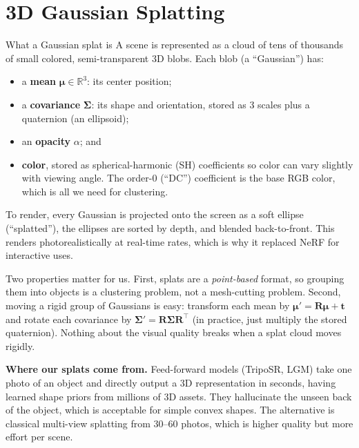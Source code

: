 \documentclass[11pt]{article}
\newcommand{\R}{\mathbf{R}}
\newcommand{\tr}{\mathbf{t}}
\begin{document}
\section{3D Gaussian Splatting}

\begin{concept}{What a Gaussian splat is}
A scene is represented as a cloud of tens of thousands of small colored, semi-transparent 3D blobs. Each blob (a ``Gaussian'') has:
\begin{itemize}[itemsep=2pt]
  \item a \textbf{mean} $\boldsymbol{\mu} \in \mathbb{R}^3$: its center position;
  \item a \textbf{covariance} $\boldsymbol{\Sigma}$: its shape and orientation, stored as 3 scales plus a quaternion (an ellipsoid);
  \item an \textbf{opacity} $\alpha$; and
  \item \textbf{color}, stored as spherical-harmonic (SH) coefficients so color can vary slightly with viewing angle. The order-0 (``DC'') coefficient is the base RGB color, which is all we need for clustering.
\end{itemize}
To render, every Gaussian is projected onto the screen as a soft ellipse (``splatted''), the ellipses are sorted by depth, and blended back-to-front. This renders photorealistically at real-time rates, which is why it replaced NeRF for interactive uses.
\end{concept}

Two properties matter for us. First, splats are a \emph{point-based} format, so grouping them into objects is a clustering problem, not a mesh-cutting problem. Second, moving a rigid group of Gaussians is easy: transform each mean by $\boldsymbol{\mu}' = \R\boldsymbol{\mu} + \tr$ and rotate each covariance by $\boldsymbol{\Sigma}' = \R\boldsymbol{\Sigma}\R^\top$ (in practice, just multiply the stored quaternion). Nothing about the visual quality breaks when a splat cloud moves rigidly.

\textbf{Where our splats come from.} Feed-forward models (TripoSR, LGM) take one photo of an object and directly output a 3D representation in seconds, having learned shape priors from millions of 3D assets. They hallucinate the unseen back of the object, which is acceptable for simple convex shapes. The alternative is classical multi-view splatting from 30--60 photos, which is higher quality but more effort per scene.
\end{document}
